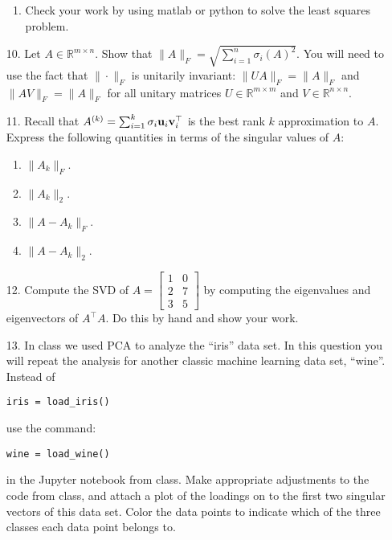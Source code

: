 \documentclass{article}
\newcommand{\bu}{{\bf u}}
\newcommand{\bv}{{\bf v}}
\begin{document}
\begin{itemize}
\begin{enumerate}
              \item Check your work by using matlab or python to solve the least squares problem.
          \end{enumerate}
    \item [10.] Let $A\in\mathbb{R}^{m\times n}$. Show that $\|A\|_{F} = \sqrt{\sum_{i=1}^{n}\sigma_{i}(A)^{2}}$. You will need to use the fact that $\|\cdot\|_{F}$ is unitarily invariant: $\|UA\|_{F} = \|A\|_{F}$ and $\|AV\|_{F} = \|A\|_{F}$ for all unitary matrices $U\in\mathbb{R}^{m\times m}$ and $V\in\mathbb{R}^{n\times n}$.
    \item [11.] Recall that $A^{(k)} = \sum_{i=1}^{k} \sigma_i\bu_{i}\bv_{i}^{\top}$ is the best rank $k$ approximation to $A$. Express the following quantities in terms of the singular values of $A$:
          \begin{enumerate}
              \item $\|A_{k}\|_{F}$.
              \item $\|A_{k}\|_{2}$.
              \item $\|A - A_{k}\|_{F}$.
              \item $\|A - A_{k}\|_{2}$.
          \end{enumerate}
    \item [12.] Compute the SVD of $\displaystyle A = \left[\begin{matrix} 1 & 0 \\ 2 & 7 \\ 3 & 5 \end{matrix}\right]$ by computing the eigenvalues and eigenvectors of $A^{\top}A$. Do this by hand and show your work.
    \item [13.] In class we used PCA to analyze the ``iris'' data set. In this question you will repeat the analysis for another classic machine learning data set, ``wine''. Instead of \begin{verbatim}iris = load_iris()\end{verbatim} use the command:\begin{verbatim}wine = load_wine()\end{verbatim} in the Jupyter notebook from class. Make appropriate adjustments to the code from class, and attach a plot of the loadings on to the first two singular vectors of this data set. Color the data points to indicate which of the three classes each data point belongs to.
\end{itemize}
\end{document}
